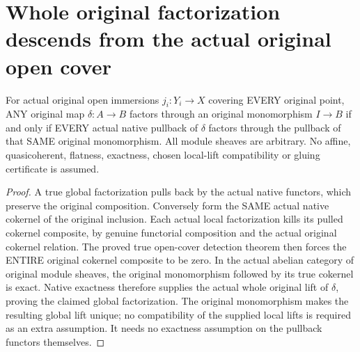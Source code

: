 \section{Whole original factorization descends from the actual original open cover}
\label{sec:scheme-module-open-cover-factorization}

\begin{theorem}
\label{sc0-scheme-module-open-cover-factorization:whole-map}
\leanok
For actual original open immersions $j_i:Y_i\to X$ covering EVERY original
point, ANY original map $\delta:A\to B$ factors through an original
monomorphism $I\to B$ if and only if EVERY actual native pullback of
$\delta$ factors through the pullback of that SAME original monomorphism.
All module sheaves are arbitrary. No affine, quasicoherent, flatness,
exactness, chosen local-lift compatibility or gluing certificate is assumed.
\end{theorem}
\begin{proof}
A true global factorization pulls back by the actual native functors,
which preserve the original composition. Conversely form the SAME actual
native cokernel of the original inclusion. Each actual local factorization
kills its pulled cokernel composite, by genuine functorial composition and
the actual original cokernel relation. The proved true
open-cover detection theorem then forces the ENTIRE original cokernel
composite to be zero. In the actual abelian category of original module
sheaves, the original monomorphism followed by its true cokernel is exact.
Native exactness therefore supplies the actual whole original lift of
$\delta$, proving the claimed global factorization. The original monomorphism makes the resulting global lift unique; no
compatibility of the supplied local lifts is required as an extra assumption. It needs no exactness assumption
on the pullback functors themselves.
\end{proof}
